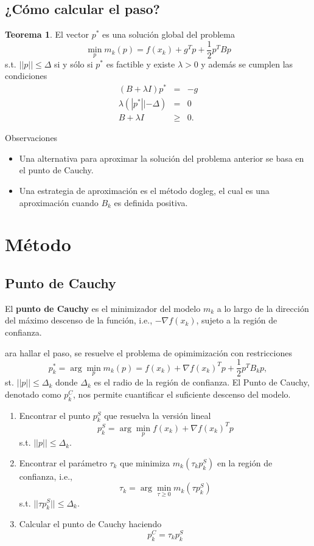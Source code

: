 \documentclass[11pt,letterpaper]{article}
\theoremstyle{definition}
\theoremstyle{definition}
\newtheorem{teo}{Teorema}[section]%
\theoremstyle{definition}
\begin{document}
\subsection{¿Cómo calcular el paso?}
\begin{shaded*}
	\begin{teo}
		El vector $ p^* $ es una solución global del problema
		\[ \min_p m_k (p) = f(x_k) + g^T p + \dfrac{1}{2} p^T B p \]
		s.t. $ ||p|| \leq \Delta $ si y sólo si $ p^* $ es factible y existe $ \lambda > 0 $ y además se cumplen las condiciones
		\begin{eqnarray*}
			(B + \lambda I) p^*       &   =  & - g \\
			\lambda (|p^*|| - \Delta) &   =  & 0 \\
			B + \lambda I             & \geq & 0. 
		\end{eqnarray*}
	\end{teo}
\end{shaded*}
Observaciones
\begin{itemize}
	\item  Una alternativa para aproximar la solución del problema anterior se basa en el punto de Cauchy.
\\
	\item  Una estrategia de aproximación es el método dogleg, el cual es una aproximación cuando $ B_k $ es definida positiva.
\end{itemize}




\section{Método}
\subsection{Punto de Cauchy}
\begin{shaded*}
	El \textbf{punto de Cauchy} es el minimizador del modelo $ m_k $ a lo largo de la dirección del máximo descenso de la función, i.e., $ -\nabla f(x_k) $, sujeto a la región de confianza.
\end{shaded*}
ara hallar el paso, se resuelve el problema de opimimización con restricciones
\[ p_k^* = \arg\min_p m_k(p) = f(x_k) + \nabla f(x_k)^T p + \dfrac{1}{2} p^T B_k p, \]
st. $ || p || \leq \Delta_k $ donde $ \Delta_k $ es el radio de la región de confianza. El Punto de Cauchy, denotado como $ p_k^C $, nos permite cuantificar el suficiente descenso del modelo. 
\begin{shaded*}
	\begin{enumerate}
		\item Encontrar el punto $ p_k^S $ que resuelva la versión lineal
		\[ p_k^S = \arg \min_p f(x_k) + \nabla f(x_k)^T p \]
		s.t. $ ||p|| \leq \Delta_k $.
		\item Encontrar el parámetro $ \tau_k $ que minimiza $ m_k(\tau_k p_k^S) $ en la región de confianza, i.e., 
		\[ \tau_k = \arg\min_{\tau\geq 0} m_k (\tau p_k^S) \]
		s.t. $ || \tau p_k^S || \leq \Delta_k $.
		\item Calcular el punto de Cauchy haciendo 
		\[ p_k^C = \tau_k p_k^S \]
	\end{enumerate}
\end{shaded*}
\end{document}
